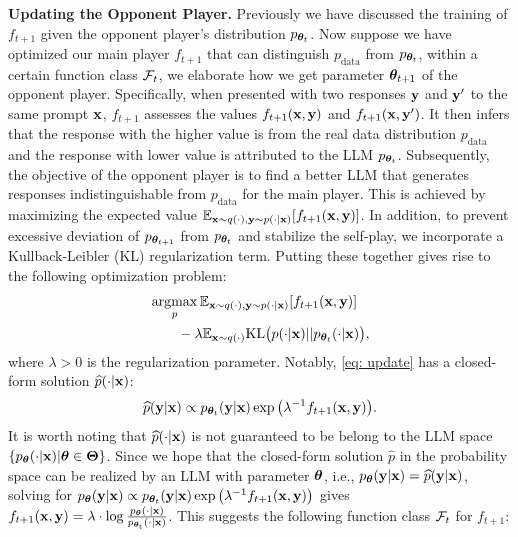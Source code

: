 \documentclass{article}
\begin{document}
\noindent \textbf{Updating the Opponent Player.} 
Previously we have discussed the training of $f_{t+1}$ given the opponent player's distribution $p_{\bm{\theta}_t}$. Now suppose we have optimized our main player $f_{t+1}$ that can distinguish $p_{\mathrm{data}}$ from $p_{\bm{\theta}_{t}}$, within a certain function class $\mathcal{F}_t$, we elaborate how we get parameter $\bm{\theta}_{t+1}$ of the opponent player.
Specifically, when presented with two responses $\mathbf{y}$ and $\mathbf{y}'$ to the same prompt $\mathbf{x}$, $f_{t+1}$ assesses the values $f_{t+1}(\mathbf{x}, \mathbf{y})$ and $f_{t+1}(\mathbf{x}, \mathbf{y}')$.
It then infers that the response with the higher value is from the real data distribution $p_{\mathrm{data}}$ and the response with lower value is attributed to the LLM $p_{\bm{\theta}_{t}}$.  
Subsequently, the objective of the opponent player is to find a better LLM that generates responses indistinguishable from $p_{\mathrm{data}}$ for the main player. 
This is achieved by maximizing the expected value $\mathbb{E}_{\mathbf{x} \sim q(\cdot), \mathbf{y}\sim p(\cdot|\mathbf{x})} [f_{t+1}(\mathbf{x}, \mathbf{y})]$.
In addition, to prevent excessive deviation of $p_{\bm{\theta}_{t+1}}$ from $p_{\bm{\theta}_{t}}$ and stabilize the self-play, we incorporate a Kullback-Leibler (KL) regularization term. Putting these together gives rise to the following optimization problem:
\begin{align}
&\mathop{\mathrm{argmax}}_ {p}\mathbb{E}_{\mathbf{x} \sim q(\cdot), \mathbf{y}\sim p(\cdot|\mathbf{x})} [f_{t+1}(\mathbf{x}, \mathbf{y})]\notag\\
&\qquad- \lambda \mathbb{E}_{\mathbf{x}\sim q(\cdot)}\mathrm{KL}\big(p(\cdot|\mathbf{x})||p_{\bm{\theta}_t}(\cdot|\mathbf{x})\big), \label{eq: update}
\end{align} 
where $\lambda>0$ is the regularization parameter. 
Notably, \eqref{eq: update} has a closed-form solution $\widehat{p}(\cdot|\mathbf{x})$: 
\begin{align}
\widehat{p}(\mathbf{y}|\mathbf{x}) \propto p_{\bm{\theta}_t}(\mathbf{y}|\mathbf{x}) \exp\big(\lambda^{-1}f_{t+1}(\mathbf{x}, \mathbf{y})\big). \label{eq:closed form solution}  
\end{align}
It is worth noting that $\widehat{p}(\cdot|\mathbf{x})$ is not guaranteed to be belong to the LLM space $\{p_{\bm{\theta}}(\cdot|\mathbf{x})|\bm{\theta} \in \bm{\Theta}\}$. 
Since we hope that the closed-form solution $\hat{p}$ in the probability space can be realized by an LLM with parameter $\bm{\theta}$, i.e., $p_{\bm{\theta}}(\mathbf{y}|\mathbf{x}) = \widehat{p}(\mathbf{y}|\mathbf{x})$,
solving for $p_{\bm{\theta}}(\mathbf{y}|\mathbf{x}) \propto p_{\bm{\theta}_t}(\mathbf{y}|\mathbf{x}) \exp\big(\lambda^{-1}f_{t+1}(\mathbf{x}, \mathbf{y})\big)$ gives $f_{t+1}(\mathbf{x}, \mathbf{y}) = \lambda\cdot \log \frac{p_{\bm{\theta}}(\cdot | \mathbf{x})}{p_{\mathrm{\bm{\theta}_t}}(\cdot | \mathbf{x})}$. 
This suggests the following function class $\mathcal{F}_t$ for $f_{t+1}$:  
\end{document}

